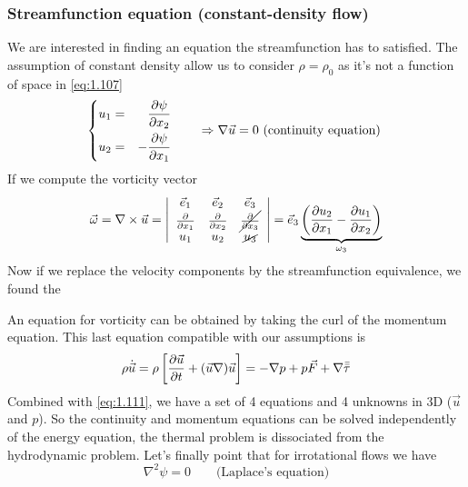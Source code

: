 		\subsubsection{Streamfunction equation (constant-density flow)} 
			We are interested in finding an equation the streamfunction has to satisfied. The assumption of constant density allow us to consider $\rho = \rho _0$ as it's not a function of space in \eqref{eq:1.107} 
			\begin{equation}
				\left\{
		\begin{aligned}
			u_1 &= &\frac{\partial\psi}{\partial x_2}\\
			u_2 &= &- \frac{\partial\psi}{\partial x_1}
		\end{aligned}
		\right.
		\qquad \Rightarrow \nabla \vec{u} = 0 \mbox{ (continuity equation) }
		\label{eq:1.111}
			\end{equation}
			If we compute the vorticity vector 
			\begin{equation}
				\vec{\omega} = \nabla \times \vec{u} = 
				\left| 
				\begin{array}{ccc}
				\vec{e}_1 & \vec{e}_2 & \vec{e}_3 \\ 
				\frac{\partial}{\partial x_1} & \frac{\partial}{\partial x_2} & \cancel{\frac{\partial}{\partial x_3}} \\ 
				u_1 & u_2 & \cancel{u_3}
				\end{array} 
				\right|
				= \vec{e}_3 \underbrace{\left(\frac{\partial u_2}{\partial x_1} - \frac{\partial u_1}{\partial x_2}\right)}_{\omega _3}
			\end{equation}
			Now if we replace the velocity components by the streamfunction equivalence, we found the
			
			\begin{center}
			\end{center}
			
		 	An equation for vorticity can be obtained by taking the curl of the momentum equation. This last equation compatible with our assumptions is 
		 	\begin{equation}
		 		\rho\dot{\vec{u}} = \rho \left[\frac{\partial \vec{u}}{\partial t} + (\vec{u}\nabla)\vec{u}\right] = -\nabla p + p\vec{F} + \nabla \bar{\bar{\tau}}
		 	\end{equation}
		 	Combined with \eqref{eq:1.111}, we have a set of 4 equations and 4 unknowns in 3D ($\vec{u}$ and $p$). So the continuity and momentum equations can be solved independently of the energy equation, the thermal problem is dissociated from the hydrodynamic problem. Let's finally point that for irrotational flows we have 
		 	\begin{equation}
		 		\nabla ^2 \psi = 0 \qquad \mbox{(Laplace's equation)} 
		 	\end{equation}